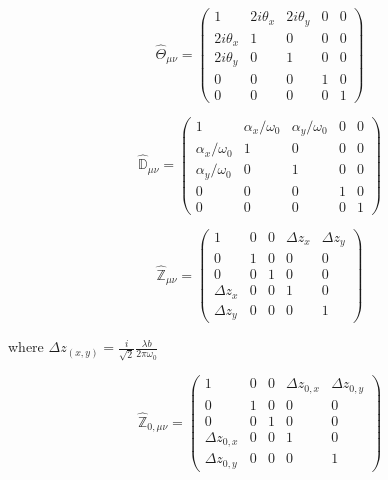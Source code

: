 \documentclass[oneside]{book}
\begin{document}
		\begin{equation} \label{misalign_matrix}
		\hat{\Theta}_{\mu \nu} = 
		\begin{pmatrix}
		   1			&2i\theta_x		&2i\theta_y		& 0 & 0
		\\ 2i\theta_x	&1				&0				& 0	& 0
		\\ 2i\theta_y	&0				&1				& 0	& 0
		\\ 0			&0				&0				& 1	& 0
		\\ 0			&0				&0				& 0	& 1
		\end{pmatrix}
		\end{equation}

		\begin{equation} \label{mistrans_matrix}
		\hat{\mathbb{D}}_{\mu \nu} = 
		\begin{pmatrix}
			1					&\alpha_x/\omega_{0}	&\alpha_y/\omega_{0}	& 0 & 0
		\\ \alpha_x/\omega_{0}	&1						&0						& 0 & 0
		\\ \alpha_y/\omega_{0}	&0						&1						& 0	& 0
		\\ 0					&0						&0						& 1	& 0
		\\ 0					&0						&0						& 0 & 1 
		\end{pmatrix}
		\end{equation}
		
		
		\begin{equation} \label{waistloc_matrix}
		\hat{\mathbb{Z}}_{\mu \nu} = 
		\begin{pmatrix}
		1				&0		&0		&\Delta z_x 	&\Delta z_y  
		\\ 0			&1		&0		&0 				&0
		\\ 0			&0		&1		&0 				&0
		\\ \Delta z_x	&0		&0		&1 				&0
		\\ \Delta z_y	&0		&0		&0				&1 
		\end{pmatrix}
		\end{equation}
		
		where $\Delta z_{(x,y)} =  \frac{i}{\sqrt{2}} \frac{\lambda b}{2\pi\omega_{0}} $
		
		
		\begin{equation} \label{waistsize_matrix}
		\hat{\mathbb{Z}}_{0, \mu \nu} = 
		\begin{pmatrix}
		1					&0		&0		&\Delta z_{0,x} 	&\Delta z_{0,y} 
		\\ 0				&1		&0		&0 					&0
		\\ 0				&0		&1		&0 					&0
		\\ \Delta z_{0,x} 	&0		&0		&1 					&0
		\\ \Delta z_{0,y} 	&0		&0		&0					&1 
		\end{pmatrix}
		\end{equation}
\end{document}
